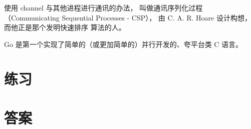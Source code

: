 使用 channel 与其他进程进行通讯的办法，
叫做通讯序列化过程（Communicating Sequential Processes - CSP），
由 C. A. R. Hoare \cite{hoare} 设计构想，而他正是那个发明快速排序 \cite{Quicksort} 算法的人。

\begin{lbar}[]
Go 是第一个实现了简单的（或更加简单的）并行开发的、夸平台类 C 语言。
\end{lbar}

\section{练习}


\cleardoublepage
\section{答案}
\shipoutAnswer

